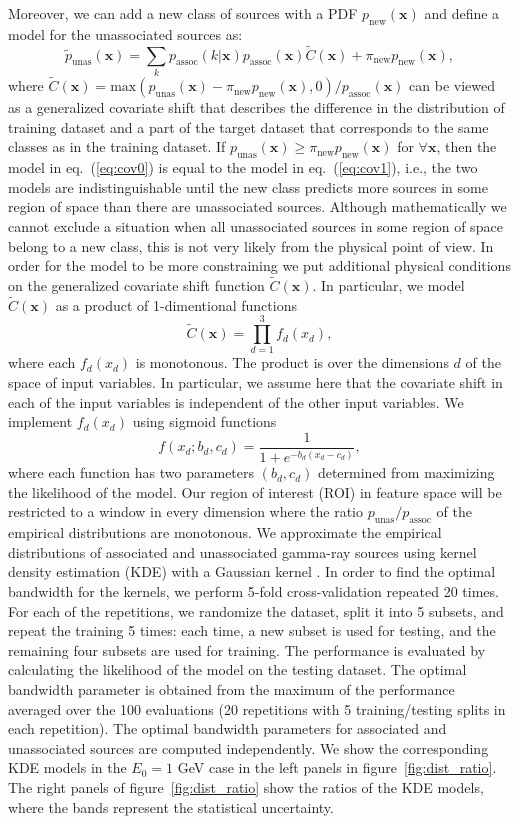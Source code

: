 \documentclass[12pt, a4paper]{article}
\newcommand{\be}{\begin{equation}}
\newcommand{\ee}{\end{equation}}
\newcommand{\bx}{\textbf{x}}
\begin{document}
Moreover, we can add a new class of sources with a PDF 
$p_\textrm{new}(\bx)$ and define a model for the unassociated sources as:
\be
\label{eq:cov1}
\tilde{p}_\textrm{unas}(\bx) 
= \sum_k p_\textrm{assoc}(k|\bx) p_\textrm{assoc}(\bx) \tilde{C}(\bx) + \pi_\textrm{new} p_\textrm{new}(\bx),
\ee
where 
$\tilde{C}(\bx) = \textrm{max}(p_\textrm{unas}(\bx) - \pi_\textrm{new}p_\textrm{new}(\bx), 0) / p_\textrm{assoc}(\bx)$ can be viewed as a generalized covariate shift that describes the difference in the distribution of training dataset and a part of the target dataset that corresponds to the same classes as in the training dataset.
If $p_\textrm{unas}(\bx) \geq \pi_\textrm{new}p_\textrm{new}(\bx)$ for $\forall \bx$, then the model in eq.~(\ref{eq:cov0}) is equal to the model in eq.~(\ref{eq:cov1}), i.e., the two models are indistinguishable until the new class predicts more sources in some region of space than there are unassociated sources.
Although mathematically we cannot exclude a situation when all unassociated sources in some region of space belong to a new class, this is not very likely from the physical point of view.
In order for the model to be more constraining we put additional physical conditions on the generalized covariate shift function $\tilde{C}(\bx)$.
In particular, we model $\tilde{C}(\bx)$ as a product of 1-dimentional functions
\be
\label{eq:cov_model}
\tilde{C}(\bx) = \prod_{d=1}^3 f_d(x_d),
\ee
where each $f_d(x_d)$ is monotonous. 
The product is over the dimensions $d$ of the space of input variables. 
In particular, we assume here that the covariate shift in each of the input variables is independent of the other input variables.  
We implement $f_d(x_d)$ using sigmoid functions
\be
\label{eq:sigmoid}
f(x_d;b_d,c_d) = \frac{1}
{1+e^{-b_d(x_d - c_d)}},
\ee
where each function has two parameters $(b_d,c_d)$ determined from maximizing the likelihood of the model. 
Our region of interest (ROI) in feature space will be restricted to a window in every dimension where the ratio 
$p_\textrm{unas}/p_\textrm{assoc}$ 
of the empirical distributions are monotonous. 
We approximate the empirical distributions of associated and unassociated gamma-ray sources using kernel density estimation (KDE) with a Gaussian kernel \cite{bishop}. 
In order to find the optimal bandwidth for the kernels, we perform 5-fold cross-validation repeated 20 times. 
For each of the repetitions, we randomize the dataset,  split it into 5 subsets, and repeat the training 5 times: each time, a new subset is used for testing, and the remaining four subsets are used for training.
The performance is evaluated by calculating the likelihood of the model on the testing dataset.
The optimal bandwidth parameter is obtained from the maximum of the performance averaged over the 100 evaluations (20 repetitions with 5 training/testing splits in each repetition).
The optimal bandwidth parameters for associated and unassociated sources are computed independently.
We show the corresponding KDE models in the $E_0 = 1$ GeV case in the left panels in figure~\ref{fig:dist_ratio}.
The right panels of figure~\ref{fig:dist_ratio} show the ratios of the KDE models, where the bands represent the statistical uncertainty.
\end{document}
